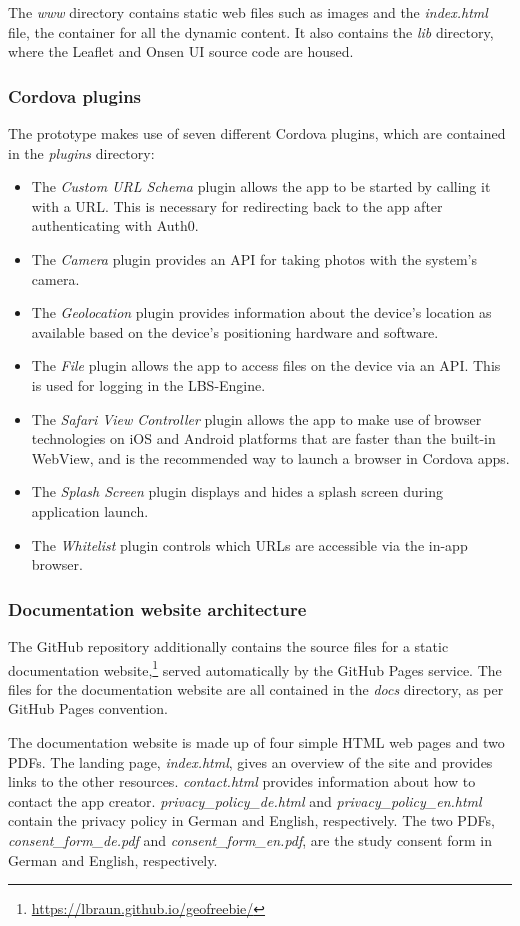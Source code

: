 The \textit{www} directory contains static web files such as images and the \textit{index.html} file, the container for all the dynamic content. It also contains the \textit{lib} directory, where the Leaflet and Onsen UI source code are housed.

\subsubsection*{Cordova plugins}

The prototype makes use of seven different Cordova plugins, which are contained in the \textit{plugins} directory:

\begin{itemize}
  \item The \textit{Custom URL Schema} plugin allows the app to be started by calling it with a URL. This is necessary for redirecting back to the app after authenticating with Auth0.
  \item The \textit{Camera} plugin provides an API for taking photos with the system's camera.
  \item The \textit{Geolocation} plugin provides information about the device's location as available based on the device's positioning hardware and software.
  \item The \textit{File} plugin allows the app to access files on the device via an API. This is used for logging in the LBS-Engine.
  \item The \textit{Safari View Controller} plugin allows the app to make use of browser technologies on iOS and Android platforms that are faster than the built-in WebView, and is the recommended way to launch a browser in Cordova apps.
  \item The \textit{Splash Screen} plugin displays and hides a splash screen during application launch.
  \item The \textit{Whitelist} plugin controls which URLs are accessible via the in-app browser.
\end{itemize}



\subsubsection*{Documentation website architecture}

The GitHub repository additionally contains the source files for a static documentation website,\footnote{\url{https://lbraun.github.io/geofreebie/}} served automatically by the GitHub Pages service.
The files for the documentation website are all contained in the \textit{docs} directory, as per GitHub Pages convention.

The documentation website is made up of four simple HTML web pages and two PDFs. The landing page, \textit{index.html}, gives an overview of the site and provides links to the other resources. \textit{contact.html} provides information about how to contact the app creator. \textit{privacy\_policy\_de.html} and \textit{privacy\_policy\_en.html} contain the privacy policy in German and English, respectively. The two PDFs, \textit{consent\_form\_de.pdf} and \textit{consent\_form\_en.pdf}, are the study consent form in German and English, respectively.
